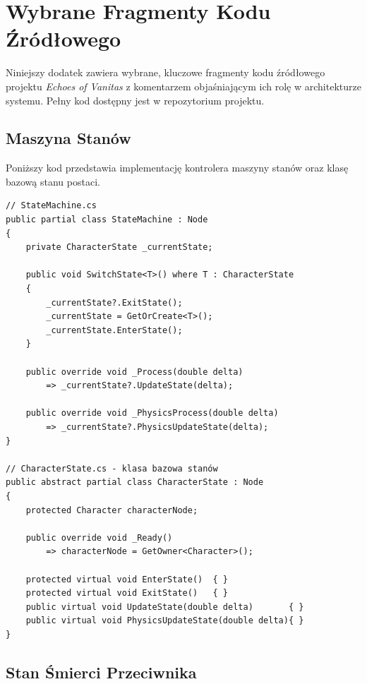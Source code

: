 \chapter{Wybrane Fragmenty Kodu Źródłowego}
\label{ch:Appendix-Code}

Niniejszy dodatek zawiera wybrane, kluczowe fragmenty kodu źródłowego projektu \textit{Echoes of Vanitas} z komentarzem objaśniającym ich rolę w architekturze systemu. Pełny kod dostępny jest w repozytorium projektu.

\section{Maszyna Stanów}

Poniższy kod przedstawia implementację kontrolera maszyny stanów oraz klasę bazową stanu postaci.

\begin{verbatim}
// StateMachine.cs
public partial class StateMachine : Node
{
    private CharacterState _currentState;

    public void SwitchState<T>() where T : CharacterState
    {
        _currentState?.ExitState();
        _currentState = GetOrCreate<T>();
        _currentState.EnterState();
    }

    public override void _Process(double delta)
        => _currentState?.UpdateState(delta);

    public override void _PhysicsProcess(double delta)
        => _currentState?.PhysicsUpdateState(delta);
}

// CharacterState.cs - klasa bazowa stanów
public abstract partial class CharacterState : Node
{
    protected Character characterNode;

    public override void _Ready()
        => characterNode = GetOwner<Character>();

    protected virtual void EnterState()  { }
    protected virtual void ExitState()   { }
    public virtual void UpdateState(double delta)       { }
    public virtual void PhysicsUpdateState(double delta){ }
}
\end{verbatim}

\section{Stan Śmierci Przeciwnika}

